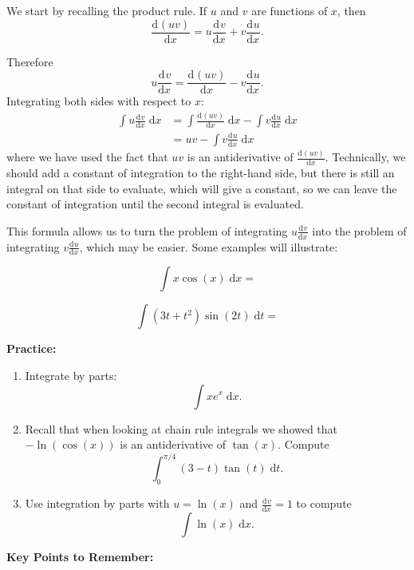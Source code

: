 \documentclass{article}
\newcommand{\deriv}[3][]{\frac{\mathrm{d}^{#1}#2}{\mathrm{d}#3^{#1}}}
\newcommand{\diff}{\;\mathrm{d}}
\begin{document}
We start by recalling the product rule. If $u$ and $v$ are functions of $x$, then
\[\deriv{(uv)}{x}=u\deriv{v}{x}+v\deriv{u}{x}.\]

Therefore
\[u\deriv{v}{x}=\deriv{(uv)}{x}-v\deriv{u}{x}.\]
Integrating both sides with respect to $x$:
\begin{align*}
	\int u\deriv{v}{x}\diff x &= \int \deriv{(uv)}{x}\diff x - \int v\deriv{u}{x}\diff x\\
	&= uv-\int v\deriv{u}{x}\diff x
\end{align*}
where we have used the fact that $uv$ is an antiderivative of $\deriv{(uv)}{x}$. Technically, we should add a constant of integration to the right-hand side, but there is still an integral on that side to evaluate, which will give a constant, so we can leave the constant of integration until the second integral is evaluated.

This formula allows us to turn the problem of integrating $u\deriv{v}{x}$ into the problem of integrating $v\deriv{u}{x}$, which may be easier. Some examples will illustrate:\bigskip

\[\int x\cos(x)\diff x=\]

\vfill

\[\int (3t+t^2)\sin(2t)\diff t=\]

\vfill






\clearpage


\textbf{Practice:}\bigskip


\begin{enumerate}
	\item Integrate by parts:
		\[\int x e^x \diff x.\]
	\item Recall that when looking at chain rule integrals we showed that $-\ln(\cos(x))$ is an antiderivative of $\tan(x)$. Compute
		\[\int_0^{\pi/4} (3-t)\tan(t)\diff t.\]
	\item Use integration by parts with $u=\ln(x)$ and $\deriv{v}{x}=1$ to compute
		\[\int \ln(x)\diff x.\]
\end{enumerate}




\clearpage


{\bf Key Points to Remember:}

\vspace{5mm}
\end{document}

